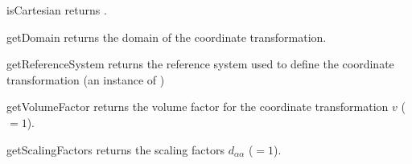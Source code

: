 \begin{methoddesc}[CartesianCoordinateTransformation]{isCartesian}{}
returns \True.
\end{methoddesc}

\begin{methoddesc}[CartesianCoordinateTransformation]{getDomain}{}
returns the domain of the coordinate transformation.
\end{methoddesc}


\begin{methoddesc}[CartesianCoordinateTransformation]{getReferenceSystem}{}
returns the reference system used to define the coordinate transformation (an instance of )
\end{methoddesc}


\begin{methoddesc}[CartesianCoordinateTransformation]{getVolumeFactor}{}
returns the volume factor for the coordinate transformation $v$ ($=1$).
\end{methoddesc}


\begin{methoddesc}[CartesianCoordinateTransformation]{getScalingFactors}{}
returns the scaling factors $d_{\alpha \alpha}$ ($=1$).
\end{methoddesc}
